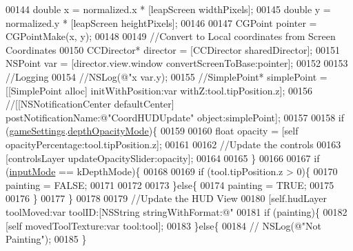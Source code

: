 \begin{DoxyCode}
{{00144             \textcolor{keywordtype}{double} x = normalized.x * [leapScreen widthPixels];
00145             \textcolor{keywordtype}{double} y = normalized.y * [leapScreen heightPixels];
00146             
00147             CGPoint pointer = CGPointMake(x, y);
00148             
00149             \textcolor{comment}{//Convert to Local coordinates from Screen Coordinates}
00150             CCDirector* director = [CCDirector sharedDirector];
00151             NSPoint var = [director.view.window convertScreenToBase:pointer];
00152             
00153             \textcolor{comment}{//Logging}
00154             \textcolor{comment}{//NSLog(@"x %
       var.y);}
00155             \textcolor{comment}{//SimplePoint* simplePoint = [[SimplePoint alloc] initWithPosition:var
       withZ:tool.tipPosition.z];}
00156             \textcolor{comment}{//[[NSNotificationCenter defaultCenter] postNotificationName:@"CoordHUDUpdate"
       object:simplePoint];}
00157 
00158             \textcolor{keywordflow}{if} (\hyperlink{interface_game_manager_a97ff3b8cd0cbc6baf6f5abe3bb3417ca}{gameSettings}.\hyperlink{interface_game_settings_a1ac5ddcb61e46f952ccd0e876a8578a4}{depthOpacityMode})\{
00159                 
00160                 \textcolor{keywordtype}{float} opacity = [\textcolor{keyword}{self} opacityPercentage:tool.tipPosition.z];
00161                 
00162                 \textcolor{comment}{//Update the controls}
00163                 [controlsLayer updateOpacitySlider:opacity];
00164                 
00165             \}
00166                     
00167             \textcolor{keywordflow}{if} (\hyperlink{interface_game_manager_a43f8cf09eea5b0766c73b0d2b258644c}{inputMode} == kDepthMode)\{
00168                 
00169                 \textcolor{keywordflow}{if} (tool.tipPosition.z > 0)\{
00170                     painting = FALSE;
00171 
00172                 
00173                 \}\textcolor{keywordflow}{else}\{
00174                     painting = TRUE;
00175                     
00176                 \}
00177             \}
00178             
00179             \textcolor{comment}{//Update the HUD View}
00180             [\textcolor{keyword}{self}.hudLayer toolMoved:var toolID:[NSString stringWithFormat:@"%
00181             \textcolor{keywordflow}{if} (painting)\{
00182                 [\textcolor{keyword}{self} movedToolTexture:var tool:tool];
00183             \}\textcolor{keywordflow}{else}\{
00184                \textcolor{comment}{// NSLog(@"Not Painting");}
00185             \}
}}
\end{DoxyCode}
